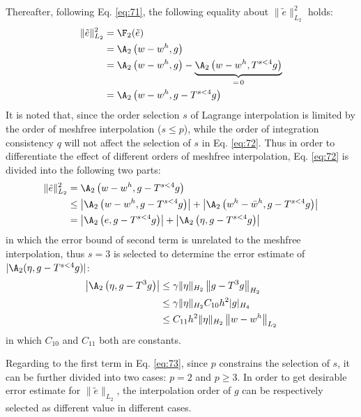 Thereafter, following Eq. \eqref{eq:71}, the following equality about $\|\tilde{e}\|^{2}_{L_2}$ holds:
\begin{equation}\label{eq:72}
\begin{aligned}
\|\tilde{e}\|^{2}_{L_2}&=\F_2(\tilde{e})\\
&=\A_2\left(w-w^{h},g\right)\\
&=\A_2\left(w-w^{h},g\right)-\underbrace{\A_2\left(w-w^{h},T^{s<4}g\right)}_{=\,0}\\
&=\A_2\left(w-w^{h},g-T^{s<4}g\right)
\end{aligned}
\end{equation}
It is noted that, since the order selection $s$ of Lagrange interpolation is limited by the order of meshfree interpolation ($s\le p$), while the order of integration consistency $q$ will not affect the selection of $s$ in Eq. \eqref{eq:72}.
Thus in order to differentiate the effect of different orders of meshfree interpolation, Eq. \eqref{eq:72} is divided into the following two parts:
\begin{equation}\label{eq:73}
\begin{aligned}
\|\tilde{e}\|^{2}_{L_2}&=\A_2\left(w-w^{h},g-T^{s<4}g\right)\\
&\le\left|\A_2\left(w-w^{h},g-T^{s<4}g\right)\right|+\left|\A_2\left(w^{h}-\bar{w}^{h},g-T^{s<4}g\right)\right|\\
&=\left|\A_2\left(e,g-T^{s<4}g\right)\right|+\left|\A_2\left(\eta,g-T^{s<4}g\right)\right|
\end{aligned}
\end{equation}
in which the error bound of second term is unrelated to the meshfree interpolation, thus $s=3$ is selected to determine the error estimate of $|\A_2(\eta,g-T^{s<4}g)|$:
\begin{equation}\label{eq:74}
\begin{aligned}
\left|\A_2\left(\eta,g-T^{3}g\right)\right|&\le\gamma\|\eta\|_{H_2}\left\|g-T^{3}g\right\|_{H_2}\\
&\le\gamma\|\eta\|_{H_2}C_{10}h^{2}|g|_{H_4}\\
&\le C_{11}h^{2}\|\eta\|_{H_2}\left\|w-w^{h}\right\|_{L_2}
\end{aligned}
\end{equation}
in which $C_{10}$ and $C_{11}$ both are constants.

Regarding to the first term in Eq. \eqref{eq:73}, since $p$ constrains the selection of $s$, it can be further divided into two cases: $p=2$ and $p\ge3$.
In order to get desirable error estimate for $\|\tilde{e}\|_{L_2}$, the interpolation order of $g$ can be respectively selected as different value in different cases.

